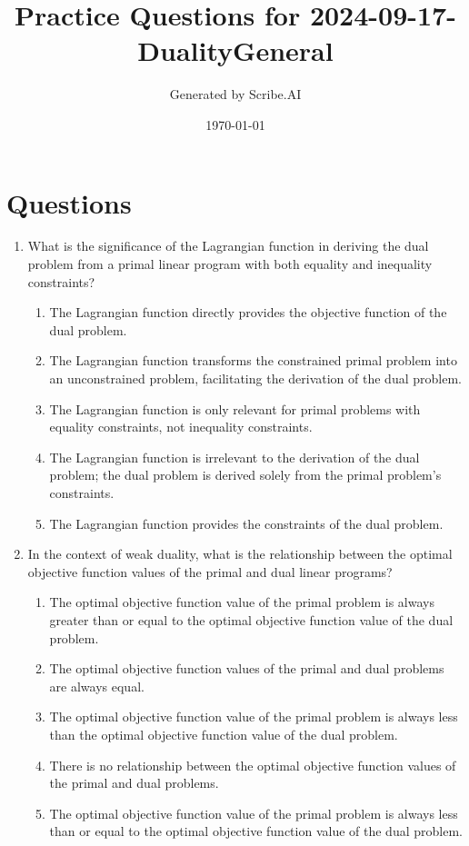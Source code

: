 \documentclass{article}%
\title{Practice Questions for 2024{-}09{-}17{-}DualityGeneral}%
\author{Generated by Scribe.AI}%
\date{\today}%
\begin{document}
%
\normalsize%
\maketitle%
\section{Questions}%
\label{sec:Questions}%
\begin{enumerate}%
\item What is the significance of the Lagrangian function in deriving the dual problem from a primal linear program with both equality and inequality constraints?%
\begin{enumerate}%
\item The Lagrangian function directly provides the objective function of the dual problem.%
\item The Lagrangian function transforms the constrained primal problem into an unconstrained problem, facilitating the derivation of the dual problem.%
\item The Lagrangian function is only relevant for primal problems with equality constraints, not inequality constraints.%
\item The Lagrangian function is irrelevant to the derivation of the dual problem; the dual problem is derived solely from the primal problem's constraints.%
\item The Lagrangian function provides the constraints of the dual problem.%
\end{enumerate}%
\vspace{1em}%
\item In the context of weak duality, what is the relationship between the optimal objective function values of the primal and dual linear programs?%
\begin{enumerate}%
\item The optimal objective function value of the primal problem is always greater than or equal to the optimal objective function value of the dual problem.%
\item The optimal objective function values of the primal and dual problems are always equal.%
\item The optimal objective function value of the primal problem is always less than the optimal objective function value of the dual problem.%
\item There is no relationship between the optimal objective function values of the primal and dual problems.%
\item The optimal objective function value of the primal problem is always less than or equal to the optimal objective function value of the dual problem.%

\end{enumerate}
\end{enumerate}
\end{document}
